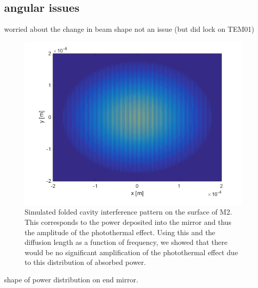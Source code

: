 \subsection{angular issues}
worried about the change in beam shape
not an issue (but did lock on TEM01)
\begin{figure}[htp]%
\begin{center}
\includegraphics[width=.8\textwidth]{figures/Angular/11deginterference}%
\caption[Folded cavity interference pattern]{Simulated folded cavity interference pattern on the surface of M2. This corresponds to the power deposited into the mirror and thus the amplitude of the photothermal effect. Using this and the diffusion length as a function of frequency, we showed that there would be no significant amplification of the photothermal effect due to this distribution of absorbed power.}%
\end{center}
\label{fig:foldedinterference}%
\end{figure}

shape of power distribution on end mirror.
